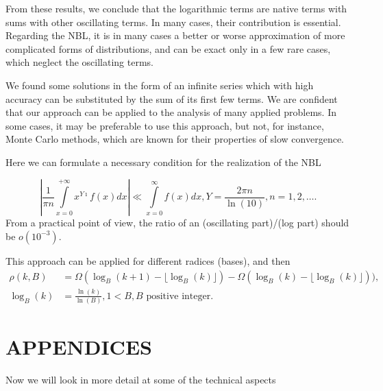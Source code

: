\documentclass[titlepage,fleqn]{article}%
\begin{document}
From these results, we conclude that the logarithmic terms are native terms
with sums with other oscillating terms. In many cases, their contribution is
essential. Regarding the NBL, it is in many cases a better or worse
approximation of more complicated forms of distributions, and can be exact
only in a few rare cases, which neglect the oscillating terms.

We found some solutions in the form of an infinite series which with high
accuracy can be substituted by the sum of its first few terms. We are
confident that our approach can be applied to the analysis of many applied
problems. In some cases, it may be preferable to use this approach, but not,
for instance, Monte Carlo methods, which are known for their properties of
slow convergence.

Here we can formulate a necessary condition for the realization of the NBL%

\begin{equation}
\left\vert \frac{1}{\pi n}%
{\displaystyle\int\limits_{x=0}^{+\infty}}
x^{Y\imath}f(x)dx\right\vert \ll%
{\displaystyle\int\limits_{x=0}^{\infty}}
f(x)dx,Y=\frac{2\pi n}{\ln(10)},n=1,2,\ldots. \label{NBLcond}%
\end{equation}
From a practical point of view, the ratio of an (oscillating part)/(log part)
should be $o(10^{-3}).$

This approach can be applied for different radices (bases), and then%
\begin{align*}
\rho(k,B)  &  =\Omega(\log_{B}(k+1)-\lfloor\log_{B}(k)\rfloor)-\Omega\left(
\log_{B}(k)-\lfloor\log_{B}(k)\rfloor\right)  ),\\
\log_{B}(k)  &  =\frac{\ln(k)}{\ln(B)},1<B,B\text{ positive integer.}%
\end{align*}
%

\section*{APPENDICES}%
%

Now we will look in more detail at some of the technical aspects%
%
\end{document}
